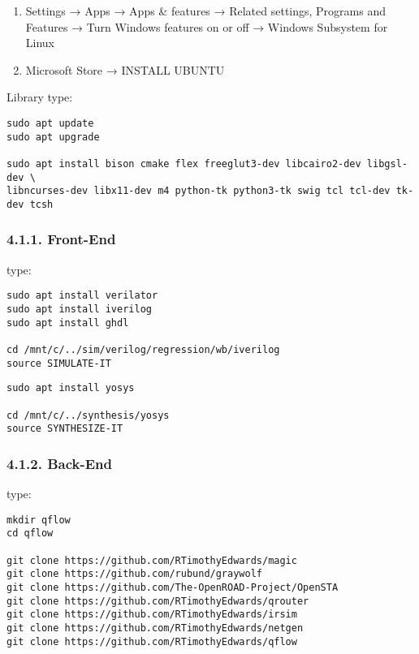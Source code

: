 \documentclass[]{article}
\begin{document}
\begin{enumerate}
\def\labelenumi{\arabic{enumi}.}
\item
  Settings → Apps → Apps \& features → Related settings, Programs and
  Features → Turn Windows features on or off → Windows Subsystem for
  Linux
\item
  Microsoft Store → INSTALL UBUNTU
\end{enumerate}

Library type:

\begin{verbatim}
sudo apt update
sudo apt upgrade

sudo apt install bison cmake flex freeglut3-dev libcairo2-dev libgsl-dev \
libncurses-dev libx11-dev m4 python-tk python3-tk swig tcl tcl-dev tk-dev tcsh
\end{verbatim}

\subsubsection{4.1.1. Front-End}\label{front-end}

type:

\begin{verbatim}
sudo apt install verilator
sudo apt install iverilog
sudo apt install ghdl

cd /mnt/c/../sim/verilog/regression/wb/iverilog
source SIMULATE-IT
\end{verbatim}

\begin{verbatim}
sudo apt install yosys

cd /mnt/c/../synthesis/yosys
source SYNTHESIZE-IT
\end{verbatim}

\subsubsection{4.1.2. Back-End}\label{back-end}

type:

\begin{verbatim}
mkdir qflow
cd qflow

git clone https://github.com/RTimothyEdwards/magic
git clone https://github.com/rubund/graywolf
git clone https://github.com/The-OpenROAD-Project/OpenSTA
git clone https://github.com/RTimothyEdwards/qrouter
git clone https://github.com/RTimothyEdwards/irsim
git clone https://github.com/RTimothyEdwards/netgen
git clone https://github.com/RTimothyEdwards/qflow
\end{verbatim}
\end{document}

